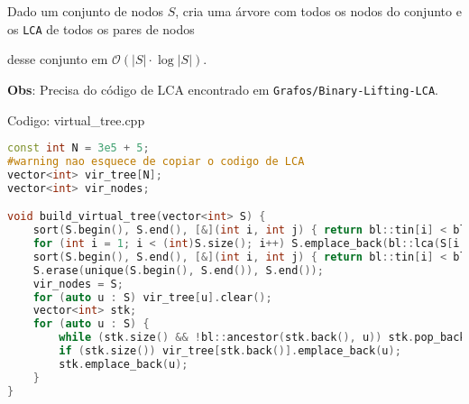 \documentclass[10pt, a4paper, oneside]{book}
\begin{document}
Dado um conjunto de nodos $S$, cria uma árvore com todos os nodos do conjunto e os \texttt{LCA} de todos os pares de nodos

desse conjunto em $\mathcal{O}(|S| \cdot \log  |S|)$.



\textbf{Obs}: Precisa do código de LCA encontrado em \texttt{Grafos/Binary-Lifting-LCA}.

\hfill

Codigo: virtual\_tree.cpp

\begin{lstlisting}[language=C++]
const int N = 3e5 + 5;
#warning nao esquece de copiar o codigo de LCA
vector<int> vir_tree[N];
vector<int> vir_nodes;

void build_virtual_tree(vector<int> S) {
    sort(S.begin(), S.end(), [&](int i, int j) { return bl::tin[i] < bl::tin[j]; });
    for (int i = 1; i < (int)S.size(); i++) S.emplace_back(bl::lca(S[i - 1], S[i]));
    sort(S.begin(), S.end(), [&](int i, int j) { return bl::tin[i] < bl::tin[j]; });
    S.erase(unique(S.begin(), S.end()), S.end());
    vir_nodes = S;
    for (auto u : S) vir_tree[u].clear();
    vector<int> stk;
    for (auto u : S) {
        while (stk.size() && !bl::ancestor(stk.back(), u)) stk.pop_back();
        if (stk.size()) vir_tree[stk.back()].emplace_back(u);
        stk.emplace_back(u);
    }
}
\end{lstlisting}
\hfill
\end{document}
